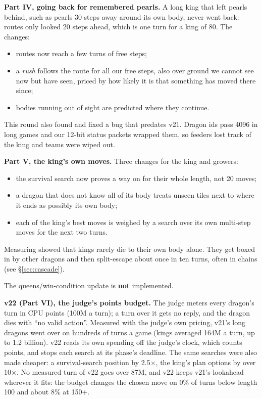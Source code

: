 \documentclass[11pt,a4paper]{article}
\begin{document}
\textbf{Part IV, going back for remembered pearls.} A long king that left pearls behind, such as pearls 30 steps
away around its own body, never went back: routes only looked 20 steps ahead, which is one turn for a king of 80.
The changes:
\begin{itemize}
      \item routes now reach a few turns of free steps;
      \item a \emph{rush} follows the route for all our free steps, also over ground we cannot see now but have seen,
            priced by how likely it is that something has moved there since;
      \item bodies running out of sight are predicted where they continue.
\end{itemize}
This round also found and fixed a bug that predates v21. Dragon ids pass 4096 in long games and our 12-bit status
packets wrapped them, so feeders lost track of the king and teams were wiped out.

\textbf{Part V, the king's own moves.} Three changes for the king and growers:
\begin{itemize}
      \item the survival search now proves a way on for their whole length, not 20 moves;
      \item a dragon that does not know all of its body treats unseen tiles next to where it ends as possibly its own body;
      \item each of the king's best moves is weighed by a search over its own multi-step moves for the next two turns.
\end{itemize}
Measuring showed that kings rarely die to their own body alone. They get boxed in by other dragons and then
split-escape about once in ten turns, often in chains (see \S\ref{sec:cascade}).

The queens/win-condition update is \textbf{not} implemented.

\textbf{v22 (Part VI), the judge's points budget.} The judge meters every dragon's turn in CPU points (100M a turn); a
turn over it gets no reply, and the dragon dies with ``no valid action''. Measured with the judge's own pricing, v21's
long dragons went over on hundreds of turns a game (kings averaged 164M a turn, up to 1.2 billion). v22 reads its own
spending off the judge's clock, which counts points, and stops each search at its phase's deadline. The same searches
were also made cheaper: a survival-search position by 2.5$\times$, the king's plan options by over 10$\times$. No measured
turn of v22 goes over 87M, and v22 keeps v21's lookahead wherever it fits: the budget changes the chosen move on 0\% of
turns below length 100 and about 8\% at 150+.
\end{document}
